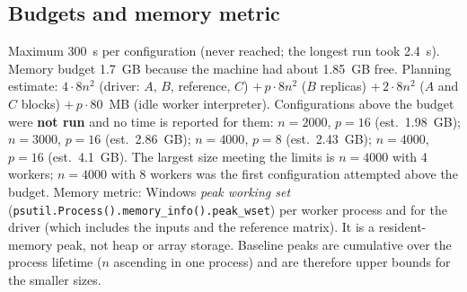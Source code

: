 \documentclass[10pt,a4paper]{article}
\begin{document}
\subsection{Budgets and memory metric}
Maximum 300~s per configuration (never reached; the longest run took 2.4~s). Memory budget 1.7~GB because the machine had about 1.85~GB free. Planning estimate: $4\cdot8n^2$ (driver: $A$, $B$, reference, $C$) $+\,p\cdot8n^2$ ($B$ replicas) $+\,2\cdot8n^2$ ($A$ and $C$ blocks) $+\,p\cdot80$~MB (idle worker interpreter).
Configurations above the budget were \textbf{not run} and no time is reported for them: $n=2000$, $p=16$ (est.\ 1.98~GB); $n=3000$, $p=16$ (est.\ 2.86~GB); $n=4000$, $p=8$ (est.\ 2.43~GB); $n=4000$, $p=16$ (est.\ 4.1~GB).
The largest size meeting the limits is $n=4000$ with 4 workers; $n=4000$ with 8 workers was the first configuration attempted above the budget.
Memory metric: Windows \emph{peak working set} (\texttt{psutil.Process().memory\_info().peak\_wset}) per worker process and for the driver (which includes the inputs and the reference matrix). It is a resident-memory peak, not heap or array storage. Baseline peaks are cumulative over the process lifetime ($n$ ascending in one process) and are therefore upper bounds for the smaller sizes.
\end{document}
